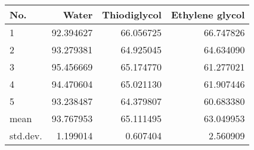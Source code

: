 \begin{tabular}{lrrr}
\toprule
     No. &     Water &  Thiodiglycol &  Ethylene glycol \\
\midrule
       1 & 92.394627 &     66.056725 &        66.747826 \\
       2 & 93.279381 &     64.925045 &        64.634090 \\
       3 & 95.456669 &     65.174770 &        61.277021 \\
       4 & 94.470604 &     65.021130 &        61.907446 \\
       5 & 93.238487 &     64.379807 &        60.683380 \\
    mean & 93.767953 &     65.111495 &        63.049953 \\
std.dev. &  1.199014 &      0.607404 &         2.560909 \\
\bottomrule
\end{tabular}